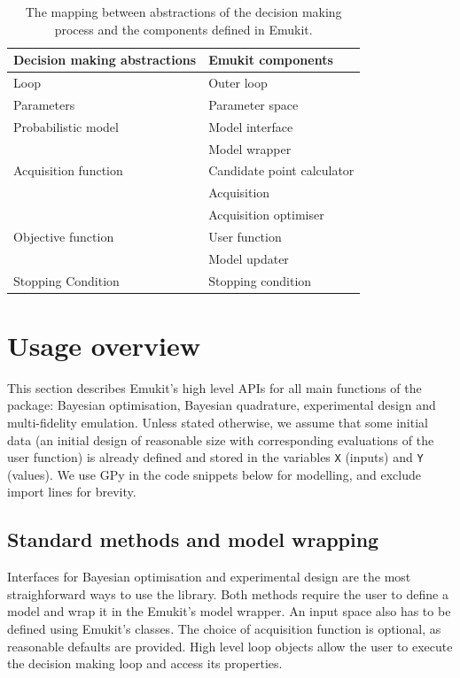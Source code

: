 \begin{table}
    \setlength{\DUtablewidth}{\tablewidth}
    \begin{longtable}[c]{p{0.4\DUtablewidth}p{0.4\DUtablewidth}}
        \toprule
        \textbf{Decision making abstractions} & \textbf{Emukit components} \\
        \midrule
        \endfirsthead
        Loop & Outer loop \\
        \midrule
        Parameters & Parameter space \\
        Probabilistic model & Model interface \\
        & Model wrapper \\
        \midrule
        Acquisition function & Candidate point calculator \\
        & Acquisition \\
        & Acquisition optimiser \\
        \midrule
        Objective function & User function \\
        & Model updater \\
        \midrule
        Stopping Condition & Stopping condition \\
        \bottomrule
    \end{longtable}
    \caption{The mapping between abstractions of the decision making process and the components defined in Emukit.}
    \label{table:abstraction_mapping}
\end{table}

\section{Usage overview}\label{sec:usage}
This section describes Emukit's high level APIs for all main functions of the package: Bayesian optimisation, Bayesian quadrature, experimental design and multi-fidelity emulation. Unless stated otherwise, we assume that some initial data (an initial design of reasonable size with corresponding evaluations of the user function) is already defined and stored in the variables \texttt{X} (inputs) and \texttt{Y} (values). We use GPy \cite{gpy2014} in the code snippets below for modelling, and exclude import lines for brevity.

\subsection{Standard methods and model wrapping}

Interfaces for Bayesian optimisation and experimental design are the most straighforward ways to use the library. Both methods require the user to define a model and wrap it in the Emukit's model wrapper. An input space also has to be defined using Emukit's classes. The choice of acquisition function is optional, as reasonable defaults are provided. High level loop objects allow the user to execute the decision making loop and access its properties.

